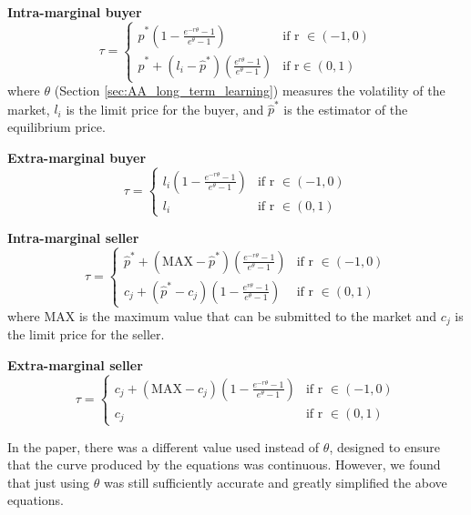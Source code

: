 \documentclass[preprint]{acm_proc_article-sp} %
\begin{document}
\textbf{Intra-marginal buyer}
\begin{equation}
    \tau =
    \begin{cases}
        \hat{p}^*(1- \frac{e^{-r\theta}-1}{e^{\theta}-1}) &  \text{if r } \in (-1,0)  \\
        \hat{p}^* + (l_i-\hat{p}^*)(\frac{e^{r\theta}-1}{e^\theta-1}) & \text{if r} \in (0,1)
    \end{cases}
    \label{eqn:intrabuyer}
\end{equation}
where $\theta$ (Section \ref{sec:AA_long_term_learning}) measures the volatility of the
market, $l_i$ is the limit price for the buyer, and $\hat{p}^*$ is the estimator of the
equilibrium price.

\textbf{Extra-marginal buyer}
\begin{equation}
    \tau =
    \begin{cases}
        l_i(1-\frac{e^{-r\theta}-1}{e^\theta-1}) &  \text{if r } \in (-1,0)  \\
        l_i & \text{if r } \in (0,1)
    \end{cases}
    \label{eqn:extrabuyer}
\end{equation}

\textbf{Intra-marginal seller}
\begin{equation}
    \tau =
    \begin{cases}
        \hat{p}^* + (\text{MAX}-\hat{p}^*)( \frac{e^{-r\theta}-1}{e^{\theta}-1}) &  \text{if r } \in (-1,0)  \\
        c_j + (\hat{p}^*-c_j)(1-\frac{e^{r\theta}-1}{e^\theta-1}) & \text{if r } \in (0,1)
    \end{cases}
    \label{eqn:intraseller}
\end{equation}
where MAX is the maximum value that can be submitted to the market and $c_j$ is
the limit price for the seller.

\textbf{Extra-marginal seller}
\begin{equation}
    \tau =
    \begin{cases}
        c_j + (\text{MAX}-c_j)(1-\frac{e^{-r\theta}-1}{e^\theta-1}) &  \text{if r } \in (-1,0)  \\
        c_j & \text{if r } \in (0,1)
    \end{cases}
    \label{eqn:extraseller}
\end{equation}

In the paper, there was a different value used instead of $\theta$, designed to
ensure that the curve produced by the equations was continuous. However, we
found that just using $\theta$ was still sufficiently accurate and greatly
simplified the above equations.
\end{document}
